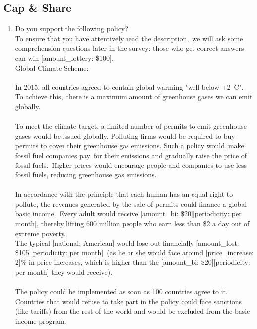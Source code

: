  \subsection*{Cap \& Share} 
 \begin{enumerate}[resume] 
\item  \label{q:gcs_support} Do you support the following policy?\\
To ensure that you have attentively read the description,~we will ask some comprehension questions later in the survey: those who get correct answers can win [amount\_lottery: \$100].
~\\
Global Climate Scheme:~\\\\
In 2015, all countries agreed to contain global warming "well below +2~\textdegree{}C". To achieve this,~there is a maximum amount of greenhouse gases we can emit globally.~\\\\
To meet the climate target, a limited number of permits to emit greenhouse gases would be issued globally. Polluting firms would be required to buy permits to cover their greenhouse gas emissions. Such a policy would~make fossil fuel companies pay~for their emissions and gradually raise the price of fossil fuels.~Higher prices would encourage people and companies to use less fossil fuels, reducing greenhouse gas emissions.\\\\
In accordance with the principle that each human has an equal right to pollute, the revenues generated by the sale of permits could finance a global basic income.~Every adult would receive [amount\_bi: \$20][periodicity: per month], thereby lifting 600 million people who earn less than \$2 a day out of extreme poverty.\\
The typical [national: American] would lose out financially [amount\_lost: \$105][periodicity: per month]~(as he or she would face around [price\_increase: 2]\% in price increases, which is higher than the [amount\_bi: \$20][periodicity: per month] they would receive).\\\\
The policy could be implemented as soon as 100 countries agree to it. Countries that would refuse to take part in the policy could face sanctions (like tariffs) from the rest of the world and would be excluded from the basic income program.\\\\
~\\\textbf{
}
\end{enumerate}
